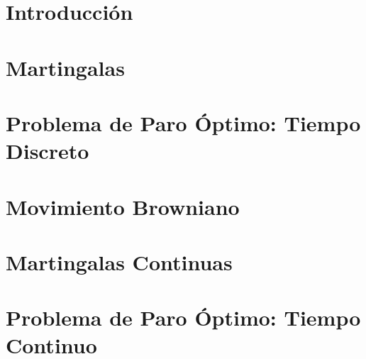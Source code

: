 \documentclass[a4paper]{book}
\theoremstyle{definition}
\theoremstyle{remark}
\begin{document}
\frontmatter





\tableofcontents

\chapter{Introducción}


\mainmatter 

\chapter{Martingalas}


\chapter{Problema de Paro Óptimo: Tiempo Discreto}


\chapter{Movimiento Browniano}


\chapter{Martingalas Continuas}


\chapter{Problema de Paro Óptimo: Tiempo Continuo}



\end{document}
